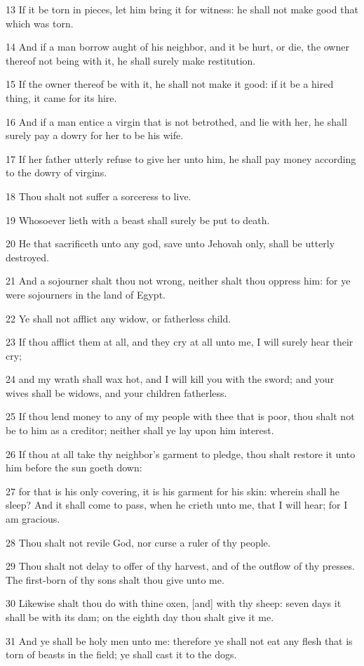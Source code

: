 \par 13 If it be torn in pieces, let him bring it for witness: he shall not make good that which was torn.
\par 14 And if a man borrow aught of his neighbor, and it be hurt, or die, the owner thereof not being with it, he shall surely make restitution.
\par 15 If the owner thereof be with it, he shall not make it good: if it be a hired thing, it came for its hire.
\par 16 And if a man entice a virgin that is not betrothed, and lie with her, he shall surely pay a dowry for her to be his wife.
\par 17 If her father utterly refuse to give her unto him, he shall pay money according to the dowry of virgins.
\par 18 Thou shalt not suffer a sorceress to live.
\par 19 Whosoever lieth with a beast shall surely be put to death.
\par 20 He that sacrificeth unto any god, save unto Jehovah only, shall be utterly destroyed.
\par 21 And a sojourner shalt thou not wrong, neither shalt thou oppress him: for ye were sojourners in the land of Egypt.
\par 22 Ye shall not afflict any widow, or fatherless child.
\par 23 If thou afflict them at all, and they cry at all unto me, I will surely hear their cry;
\par 24 and my wrath shall wax hot, and I will kill you with the sword; and your wives shall be widows, and your children fatherless.
\par 25 If thou lend money to any of my people with thee that is poor, thou shalt not be to him as a creditor; neither shall ye lay upon him interest.
\par 26 If thou at all take thy neighbor's garment to pledge, thou shalt restore it unto him before the sun goeth down:
\par 27 for that is his only covering, it is his garment for his skin: wherein shall he sleep? And it shall come to pass, when he crieth unto me, that I will hear; for I am gracious.
\par 28 Thou shalt not revile God, nor curse a ruler of thy people.
\par 29 Thou shalt not delay to offer of thy harvest, and of the outflow of thy presses. The first-born of thy sons shalt thou give unto me.
\par 30 Likewise shalt thou do with thine oxen, [and] with thy sheep: seven days it shall be with its dam; on the eighth day thou shalt give it me.
\par 31 And ye shall be holy men unto me: therefore ye shall not eat any flesh that is torn of beasts in the field; ye shall cast it to the dogs.

